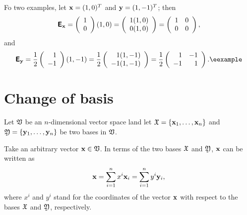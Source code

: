 {
\color{blue}
\bexample
Fo two examples, let
${\bf x}=(1,0)^T$
and
${\bf y}=(1,-1)^T$;
then
$$
\textsf{\textbf{E}}_{\bf x}
=
\left(
\begin{array}{l}
1\\
0
\end{array}
\right)
(1,0)
=
\left(
\begin{array}{rrrrrrrrrrrrrrrrrrrrrrrrrr}
1(1,0)\\
0(1,0)
\end{array}
\right)
=
\left(
\begin{array}{rrrrrrrrrrrrrrrrrrrrrrrrrr}
1&0\\
0&0
\end{array}
\right),
$$
and
$$
\textsf{\textbf{E}}_{\bf y}
= \frac{1}{2}
\left(
\begin{array}{r}
1\\
-1
\end{array}
\right)
(1,-1)
= \frac{1}{2}
\left(
\begin{array}{rrrrrrrrrrrrrrrrrrrrrrrrrr}
1(1,-1)\\
-1(1,-1)
\end{array}
\right)
= \frac{1}{2}
\left(
\begin{array}{rrrrrrrrrrrrrrrrrrrrrrrrrr}
1&-1\\
-1&1
\end{array}
\right).\textrm{\eexample}
$$
}





\section{Change of basis}

Let ${\frak V}$ be an $n$-dimensional vector space land let
${\frak X}
=
\{
{\bf x}_1,
\ldots ,
{\bf x}_n
\}$
and
${\frak Y}
=  \{
{\bf y}_1,
\ldots ,
{\bf y}_n
\}$ be two bases  in ${\frak V}$.

Take an arbitrary vector ${\bf x}\in {\frak V}$.
In terms of the two bases
${\frak X}$ and
${\frak Y}$,
${\bf x}$ can be written as
\begin{equation}
{\bf x}=
\sum_{i=1}^n x^i{\bf x}_i
=
\sum_{i=1}^n  y^i{\bf y}_i,
\label{2011-m-btbexy}
\end{equation}
where $x^i$ and $y^i$ stand for the coordinates of the vector  ${\bf x}$
with respect to the bases ${\frak X}$ and
${\frak Y}$,
respectively.


